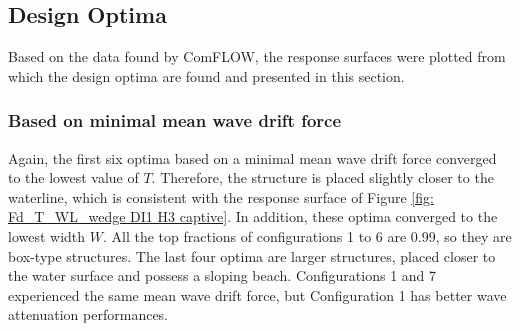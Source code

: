 \subsection{Design Optima}
Based on the data found by ComFLOW, the response surfaces were plotted from which the design optima are found and presented in this section. 


\subsubsection{Based on minimal mean wave drift force}
Again, the first six optima based on a minimal mean wave drift force converged to the lowest value of $T$. Therefore, the structure is placed slightly closer to the waterline, which is consistent with the response surface of Figure \ref{fig: Fd_T_WL_wedge DI1 H3 captive}. In addition, these optima converged to the lowest width $W$. All the top fractions of configurations 1 to 6 are 0.99, so they are box-type structures. 
The last four optima are larger structures, placed closer to the water surface and possess a sloping beach. Configurations 1 and 7 experienced the same mean wave drift force, but Configuration 1 has better wave attenuation performances. 


\begin{table}[h]
\centering
{}
\caption{Parameters optimal breakwaters based on minimal mean wave drift force}
\label{tab: most optimal breakwaters DI2 Fd}
\end{table}



